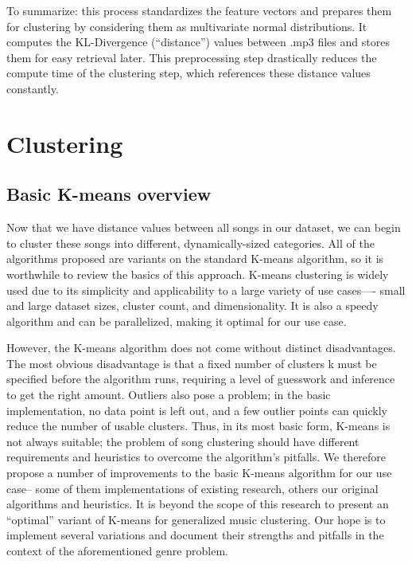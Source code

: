 \documentclass[12pt,twocolumn,titlepage]{article}
\begin{document}
To summarize: this process standardizes the feature vectors and prepares them for clustering by considering them as multivariate normal distributions. It computes the KL-Divergence (``distance'') values between .mp3 files and stores them for easy retrieval later. This preprocessing step drastically reduces the compute time of the clustering step, which references these distance values constantly.


\section{Clustering}
\label{sec:clustering}

\subsection{Basic K-means overview}

Now that we have distance values between all songs in our dataset, we can begin to cluster these songs into different, dynamically-sized categories. All of the algorithms proposed are variants on the standard K-means algorithm, so it is worthwhile to review the basics of this approach. K-means clustering is widely used due to its simplicity and applicability to a large variety of use cases—- small and large dataset sizes, cluster count, and dimensionality. It is also a speedy algorithm and can be parallelized, making it optimal for our use case.


However, the K-means algorithm does not come without distinct disadvantages.  The most obvious disadvantage is that a fixed number of clusters k must be specified before the algorithm runs, requiring a level of guesswork and inference to get the right amount. Outliers also pose a problem; in the basic implementation, no data point is left out, and a few outlier points can quickly reduce the number of usable clusters. \cite{Sing} Thus, in its most basic form, K-means is not always suitable; the problem of song clustering should have different requirements and heuristics to overcome the algorithm's pitfalls. We therefore propose a number of improvements to the basic K-means algorithm for our use case-- some of them implementations of existing research, others our original algorithms and heuristics. It is beyond the scope of this research to present an ``optimal'' variant of K-means for generalized music clustering. Our hope is to implement several variations and document their strengths and pitfalls in the context of the aforementioned genre problem.
\end{document}

